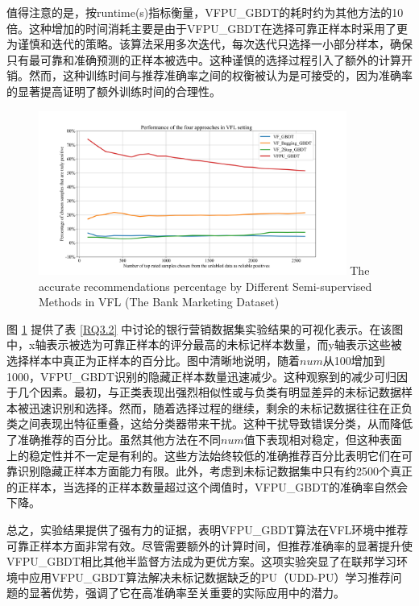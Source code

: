 值得注意的是，按runtime(s)指标衡量，VFPU\_GBDT的耗时约为其他方法的10倍。这种增加的时间消耗主要是由于VFPU\_GBDT在选择可靠正样本时采用了更为谨慎和迭代的策略。该算法采用多次迭代，每次迭代只选择一小部分样本，确保只有最可靠和准确预测的正样本被选中。这种谨慎的选择过程引入了额外的计算开销。然而，这种训练时间与推荐准确率之间的权衡被认为是可接受的，因为准确率的显著提高证明了额外训练时间的合理性。
\vspace{-0.1cm}
\begin{figure}[H]
	\centering 
	\includegraphics[width=0.9\textwidth]{chapters/imgs/Figure 5 in JPEG format}
	{\centering \wuhao The accurate recommendations percentage by Different Semi-supervised Methods in VFL (The Bank Marketing Dataset)}
	\label{fig:GBDT}
\end{figure}
\vspace{-0.35cm}
图  \ref{fig:GBDT} 提供了表 \ref{RQ3.2} 中讨论的银行营销数据集实验结果的可视化表示。在该图中，x轴表示被选为可靠正样本的评分最高的未标记样本数量，而y轴表示这些被选择样本中真正为正样本的百分比。图中清晰地说明，随着$num$从100增加到1000，VFPU\_GBDT识别的隐藏正样本数量迅速减少。这种观察到的减少可归因于几个因素。最初，与正类表现出强烈相似性或与负类有明显差异的未标记数据样本被迅速识别和选择。然而，随着选择过程的继续，剩余的未标记数据往往在正负类之间表现出特征重叠，这给分类器带来干扰。这种干扰导致错误分类，从而降低了准确推荐的百分比。虽然其他方法在不同$num$值下表现相对稳定，但这种表面上的稳定性并不一定是有利的。这些方法始终较低的准确推荐百分比表明它们在可靠识别隐藏正样本方面能力有限。此外，考虑到未标记数据集中只有约2500个真正的正样本，当选择的正样本数量超过这个阈值时，VFPU\_GBDT的准确率自然会下降。

总之，实验结果提供了强有力的证据，表明VFPU\_GBDT算法在VFL环境中推荐可靠正样本方面非常有效。尽管需要额外的计算时间，但推荐准确率的显著提升使VFPU\_GBDT相比其他半监督方法成为更优方案。这项实验突显了在联邦学习环境中应用VFPU\_GBDT算法解决未标记数据缺乏的PU（UDD-PU）学习推荐问题的显著优势，强调了它在高准确率至关重要的实际应用中的潜力。
